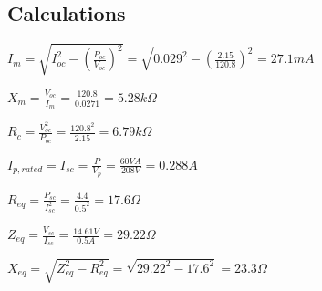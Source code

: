 \subsection{Calculations}
	\begin{center}
	\end{center}
	\begin{center}
		$I_m=\sqrt{I_{oc}^2-(\frac{P_{oc}}{V_{oc}})^2}=\sqrt{0.029^2-(\frac{2.15}{120.8})^2}=27.1mA$
	\end{center}
	\begin{center}
		$X_m=\frac{V_{oc}}{I_m}=\frac{120.8}{0.0271}=\boxed{5.28k\Omega}$
	\end{center}
	\begin{center}
		$R_c=\frac{V_{oc}^2}{P_{oc}}=\frac{120.8^2}{2.15}=\boxed{6.79k\Omega}$
	\end{center}
	\begin{center}
	\end{center}
	\begin{center}
		$I_{p,rated}=I_{sc}=\frac{P}{V_p}=\frac{60VA}{208V}=0.288A$
	\end{center}
	\begin{center}
		$R_{eq}=\frac{P_{sc}}{I_{sc}^2}=\frac{4.4}{0.5^2}=\boxed{17.6\Omega}$
	\end{center}
	\begin{center}
		$Z_{eq}=\frac{V_{sc}}{I_{sc}}=\frac{14.61V}{0.5A}=29.22\Omega$
	\end{center}
	\begin{center}
		$X_{eq}=\sqrt{Z_{eq}^2-R_{eq}^2}=\sqrt{29.22^2-17.6^2}=\boxed{23.3\Omega}$
	\end{center}
